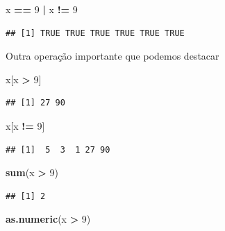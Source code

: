 \documentclass[
]{book}
\newenvironment{Shaded}{\begin{snugshade}}{\end{snugshade}}
\newcommand{\DecValTok}[1]{\textcolor[rgb]{0.00,0.00,0.81}{#1}}
\newcommand{\KeywordTok}[1]{\textcolor[rgb]{0.13,0.29,0.53}{\textbf{#1}}}
\newcommand{\NormalTok}[1]{#1}
\newcommand{\OperatorTok}[1]{\textcolor[rgb]{0.81,0.36,0.00}{\textbf{#1}}}
\newcommand{\StringTok}[1]{\textcolor[rgb]{0.31,0.60,0.02}{#1}}
\theoremstyle{definition}
\theoremstyle{definition}
\theoremstyle{definition}
\theoremstyle{remark}
\begin{document}
\begin{Shaded}
\begin{Highlighting}[]
\NormalTok{x }\OperatorTok{==}\StringTok{ }\DecValTok{9} \OperatorTok{|}\StringTok{ }\NormalTok{x }\OperatorTok{!=}\StringTok{ }\DecValTok{9}
\end{Highlighting}
\end{Shaded}

\begin{verbatim}
## [1] TRUE TRUE TRUE TRUE TRUE TRUE
\end{verbatim}

Outra operação importante que podemos destacar

\begin{Shaded}
\begin{Highlighting}[]
\NormalTok{x[x }\OperatorTok{>}\StringTok{ }\DecValTok{9}\NormalTok{]}
\end{Highlighting}
\end{Shaded}

\begin{verbatim}
## [1] 27 90
\end{verbatim}

\begin{Shaded}
\begin{Highlighting}[]
\NormalTok{x[x }\OperatorTok{!=}\StringTok{ }\DecValTok{9}\NormalTok{]}
\end{Highlighting}
\end{Shaded}

\begin{verbatim}
## [1]  5  3  1 27 90
\end{verbatim}

\begin{Shaded}
\begin{Highlighting}[]
\KeywordTok{sum}\NormalTok{(x }\OperatorTok{>}\StringTok{ }\DecValTok{9}\NormalTok{)}
\end{Highlighting}
\end{Shaded}

\begin{verbatim}
## [1] 2
\end{verbatim}

\begin{Shaded}
\begin{Highlighting}[]
\KeywordTok{as.numeric}\NormalTok{(x }\OperatorTok{>}\StringTok{ }\DecValTok{9}\NormalTok{)}
\end{Highlighting}
\end{Shaded}
\end{document}
